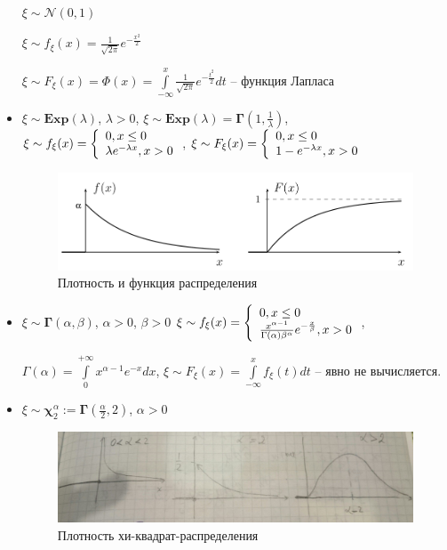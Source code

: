 \begin{defs}
\begin{itemize}
		$\xi \sim \mathcal{N}(0,1)$

		$\xi \sim f_{\xi}(x) = \frac{1}{\sqrt{2\pi}} e^{-\frac{x^{2}}{2}}$

		$\xi \sim F_{\xi}(x) = \Phi(x) = \int\limits_{-\infty}^{x} \frac{1}{\sqrt{2\pi}} e^{-\frac{t^{2}}{2}} dt$ -- функция Лапласа

		\item {}

		$\xi \sim \boldsymbol{Exp}(\lambda)$, $\lambda > 0$, $\xi \sim \boldsymbol{Exp}(\lambda) = \boldsymbol{\Gamma}(1, \frac{1}{\lambda})$,
		$\xi \sim f_{\xi}(x) = \left\{\begin{array}{l} 	0 , x \leq 0 \\ \lambda e^{-\lambda x}, x > 0 \end{array}\right.$, $\xi \sim F_{\xi}(x) = \left\{\begin{array}{l} 			0 , x \leq 0 \\ 1-e^{-\lambda x}, x > 0 \end{array}\right.$
		\begin{figure}[H]
		      \centering
		      \includegraphics[width=0.8\linewidth]{img/expon.png}
		      \caption{Плотность и функция распределения}
		\end{figure}
		\item {}

		$\xi \sim \boldsymbol{\Gamma}(\alpha, \beta)$, $\alpha > 0$, $\beta > 0$
		$\xi \sim f_{\xi}(x) = \left\{\begin{array}{l} 	0 , x \leq 0 \\
			\frac{x^{\alpha - 1}}{\Gamma(\alpha) \beta^{\alpha}} e^{-\frac{x}{\beta}}, x > 0 \end{array}\right.$,

			$\Gamma(\alpha) = \int\limits_{0}^{+\infty} x^{\alpha -1} e^{-x} dx$, $\xi \sim F_{\xi}(x) = \int\limits_{-\infty}^{x} f_{\xi}(t)dt$ -- явно не вычисляется.
			\item {}

			$\xi \sim \boldsymbol{\chi}_{2}^{\alpha} := \boldsymbol{\Gamma}(\frac{\alpha}{2}, 2)$, $\alpha > 0$
			\begin{figure}[H]
			      \centering
			      \includegraphics[width=0.8\linewidth]{img/chi.png}
			      \caption{Плотность хи-квадрат-распределения}
			\end{figure}
	\end{itemize}
\end{defs}
\newpage
